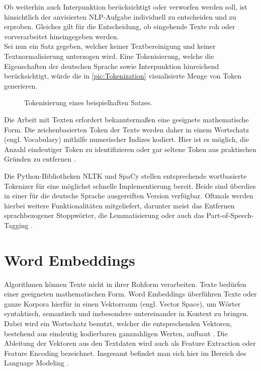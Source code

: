 \noindent
Ob weiterhin auch Interpunktion berücksichtigt oder verworfen werden soll, ist hinsichtlich der anvisierten \ac{NLP}-Aufgabe individuell zu entscheiden und zu erproben. Gleiches gilt für die Entscheidung, ob eingehende Texte roh oder vorverarbeitet hineingegeben werden.\\

\noindent
Sei nun ein Satz gegeben, welcher keiner Textbereinigung und keiner Textnormalisierung unterzogen wird. Eine Tokenisierung, welche die Eigenschaften der deutschen Sprache sowie Interpunktion hinreichend berücksichtigt, würde die in \autoref{pic:Tokenization} visualisierte Menge von Token generieren.

\begin{figure}[h!]
  \centering
  \caption{Tokenisierung eines beispielhaften Satzes.}
  \label{pic:Tokenization}
\end{figure}

\noindent
Die Arbeit mit Texten erfordert bekanntermaßen eine geeignete mathematische Form. Die zeichenbasierten Token der Texte werden daher in einem Wortschatz (engl. Vocabulary) mithilfe numerischer Indizes kodiert. Hier ist es möglich, die Anzahl eindeutiger Token zu identifizieren oder gar seltene Token aus praktischen Gründen zu entfernen \cite[S.~311-312]{ZHA20}.
\newpage

\noindent
Die Python-Bibliotheken \ac{NLTK} und SpaCy stellen entsprechende wortbasierte Tokenizer für eine möglichst schnelle Implementierung bereit. Beide sind überdies in einer für die deutsche Sprache ausgereiften Version verfügbar. Oftmals werden hierbei weitere Funktionalitäten mitgeliefert, darunter meist das Entfernen sprachbezogener Stoppwörter, die Lemmatisierung oder auch das Part-of-Speech-Tagging \cite[S.~111]{BIR09}.


\section{Word Embeddings}
\noindent
Algorithmen können Texte nicht in ihrer Rohform verarbeiten. Texte bedürfen einer geeigneten mathematischen Form. Word Embeddings überführen Texte oder ganze Korpora hierfür in einen Vektorraum (engl. Vector Space), um Wörter syntaktisch, semantisch und insbesondere untereinander in Kontext zu bringen. Dabei wird ein Wortschatz benutzt, welcher die entsprechenden Vektoren, bestehend aus eindeutig kodierbaren ganzzahligen Werten, aufbaut \cite{KAR18}. Die Ableitung der Vektoren aus den Textdaten wird auch als Feature Extraction oder Feature Encoding bezeichnet. Insgesamt befindet man sich hier im Bereich des Language Modeling \cite{BRO19}.\\

